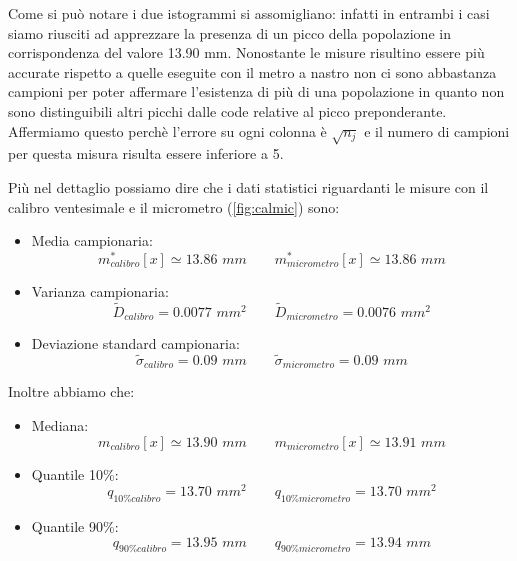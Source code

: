 Come si può notare i due istogrammi si assomigliano: infatti in entrambi i casi
siamo riusciti ad apprezzare la presenza di un picco della popolazione in
corrispondenza del valore 13.90 mm. Nonostante le misure risultino essere
più accurate rispetto a quelle eseguite con il metro a nastro non ci sono
abbastanza campioni per poter affermare l'esistenza di più di una popolazione
in quanto non sono distinguibili altri picchi dalle code relative al picco preponderante.
Affermiamo questo perchè l'errore su ogni colonna è $\sqrt{n_j}$ %
e il numero di campioni per questa misura risulta essere inferiore a 5.

\newpage
Più nel dettaglio possiamo dire che i dati statistici riguardanti le misure con il calibro ventesimale e il micrometro (\ref{fig:calmic}) sono:
\begin{itemize}
    \item{Media campionaria:}
        \begin{equation}
        m^*_{calibro}[x] \simeq 13.86\,\,mm \qquad
        m^*_{micrometro}[x] \simeq 13.86\,\,mm 
        \end{equation}

    \item{Varianza campionaria:}
        \begin{equation}
        \tilde{D}_{calibro} = 0.0077\,\,mm^2 \qquad
        \tilde{D}_{micrometro} = 0.0076\,\,mm^2
        \end{equation}

    \item{Deviazione standard campionaria:}
        \begin{equation}
        \tilde{\sigma}_{calibro} = 0.09\,\,mm \qquad
        \tilde{\sigma}_{micrometro} = 0.09\,\,mm
        \end{equation}
\end{itemize}
Inoltre abbiamo che:

\begin{itemize}
    \item{Mediana:}
        \begin{equation}
        m_{calibro}[x] \simeq 13.90\,\,mm \qquad
        m_{micrometro}[x] \simeq 13.91\,\,mm 
        \end{equation}

    \item{Quantile 10\%:}
        \begin{equation}
        q_{10\%calibro} = 13.70\,\,mm^2 \qquad
        q_{10\%micrometro} = 13.70\,\,mm^2
        \end{equation}

    \item{Quantile 90\%:}
        \begin{equation}
        q_{90\%calibro} = 13.95\,\,mm \qquad
        q_{90\%micrometro} = 13.94\,\,mm
        \end{equation}
\end{itemize}

